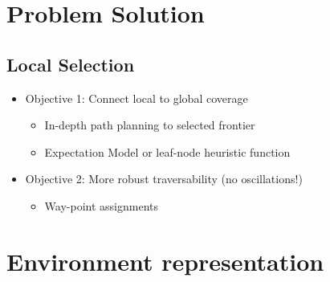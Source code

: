 \documentclass[letterpaper, 10 pt, conference]{ieeeconf}  %
\begin{document}
\section{Problem Solution}

\subsection{Local Selection}

\begin{itemize}
  \item Objective 1: Connect local to global coverage
  \begin{itemize}
  \item In-depth path planning to selected frontier
  \item Expectation Model or leaf-node heuristic function
  \end{itemize}
  \item Objective 2: More robust traversability (no oscillations!)
  \begin{itemize}
  \item Way-point assignments 
  \end{itemize}
\end{itemize}


\section{Environment representation}
\end{document}
